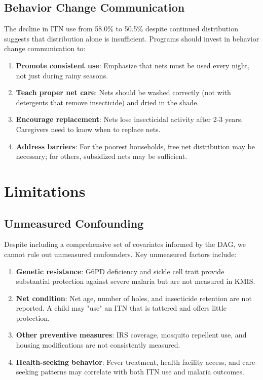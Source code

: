 \subsection{Behavior Change Communication}

The decline in ITN use from 58.0\% to 50.5\% despite continued distribution suggests that distribution alone is insufficient. Programs should invest in behavior change communication to:

\begin{enumerate}
	\item \textbf{Promote consistent use}: Emphasize that nets must be used every night, not just during rainy seasons.
	
	\item \textbf{Teach proper net care}: Nets should be washed correctly (not with detergents that remove insecticide) and dried in the shade.
	
	\item \textbf{Encourage replacement}: Nets lose insecticidal activity after 2-3 years. Caregivers need to know when to replace nets.
	
	\item \textbf{Address barriers}: For the poorest households, free net distribution may be necessary; for others, subsidized nets may be sufficient.
\end{enumerate}

\section{Limitations}

\subsection{Unmeasured Confounding}

Despite including a comprehensive set of covariates informed by the DAG, we cannot rule out unmeasured confounders. Key unmeasured factors include:

\begin{enumerate}
	\item \textbf{Genetic resistance}: G6PD deficiency and sickle cell trait provide substantial protection against severe malaria but are not measured in KMIS.
	
	\item \textbf{Net condition}: Net age, number of holes, and insecticide retention are not reported. A child may "use" an ITN that is tattered and offers little protection.
	
	\item \textbf{Other preventive measures}: IRS coverage, mosquito repellent use, and housing modifications are not consistently measured.
	
	\item \textbf{Health-seeking behavior}: Fever treatment, health facility access, and care-seeking patterns may correlate with both ITN use and malaria outcomes.
\end{enumerate}

